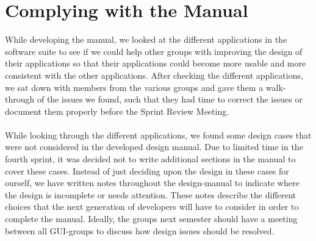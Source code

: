 \section{Complying with the Manual}
\label{sec:complying_with_the_manual}
While developing the manual, we looked at the different applications in the \giraf software suite to see if we could help other groups with improving the design of their applications so that their applications could become more usable and more consistent with the other applications. After checking the different applications, we sat down with members from the various groups and gave them a walk-through of the issues we found, such that they had time to correct the issues or document them properly before the Sprint Review Meeting.
\\\\
While looking through the different applications, we found some design cases that were not considered in the developed design manual. Due to limited time in the fourth sprint, it was decided not to write additional sections in the manual to cover these cases. Instead of just deciding upon the design in these cases for ourself, we have written notes throughout the design-manual to indicate where the design is incomplete or needs attention. These notes describe the different choices that the next generation of \giraf developers will have to consider in order to complete the manual. Ideally, the groups next semester should have a meeting between all GUI-groups to discuss how design issues should be resolved.